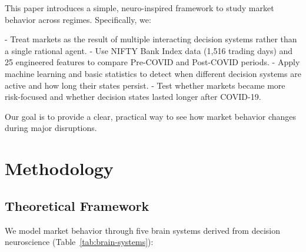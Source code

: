 \documentclass[conference]{IEEEtran}
\begin{document}
This paper introduces a simple, neuro-inspired framework to study market behavior across regimes. Specifically, we:

- Treat markets as the result of multiple interacting decision systems rather than a single rational agent.
- Use NIFTY Bank Index data (1,516 trading days) and 25 engineered features to compare Pre-COVID and Post-COVID periods.
- Apply machine learning and basic statistics to detect when different decision systems are active and how long their states persist.
- Test whether markets became more risk-focused and whether decision states lasted longer after COVID-19.

Our goal is to provide a clear, practical way to see how market behavior changes during major disruptions.





\section{Methodology}

\subsection{Theoretical Framework}

We model market behavior through five brain systems derived from decision neuroscience (Table~\ref{tab:brain-systems}):
\end{document}

